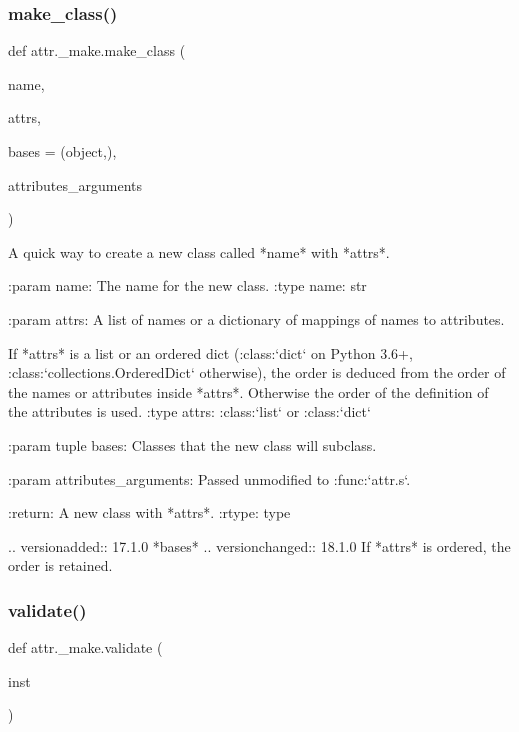 \subsubsection{\texorpdfstring{make\+\_\+class()}{make\_class()}}
{\footnotesize\ttfamily def attr.\+\_\+make.\+make\+\_\+class (\begin{DoxyParamCaption}\item[{}]{name,  }\item[{}]{attrs,  }\item[{}]{bases = {\ttfamily (object,)},  }\item[{}]{attributes\+\_\+arguments }\end{DoxyParamCaption})}

\begin{DoxyVerb}A quick way to create a new class called *name* with *attrs*.

:param name: The name for the new class.
:type name: str

:param attrs: A list of names or a dictionary of mappings of names to
    attributes.

    If *attrs* is a list or an ordered dict (:class:`dict` on Python 3.6+,
    :class:`collections.OrderedDict` otherwise), the order is deduced from
    the order of the names or attributes inside *attrs*.  Otherwise the
    order of the definition of the attributes is used.
:type attrs: :class:`list` or :class:`dict`

:param tuple bases: Classes that the new class will subclass.

:param attributes_arguments: Passed unmodified to :func:`attr.s`.

:return: A new class with *attrs*.
:rtype: type

.. versionadded:: 17.1.0 *bases*
.. versionchanged:: 18.1.0 If *attrs* is ordered, the order is retained.
\end{DoxyVerb}
 \mbox{\label{namespaceattr_1_1__make_ae0977efca96d32ec875de623eb6887c3}} 
\subsubsection{\texorpdfstring{validate()}{validate()}}
{\footnotesize\ttfamily def attr.\+\_\+make.\+validate (\begin{DoxyParamCaption}\item[{}]{inst }\end{DoxyParamCaption})}

